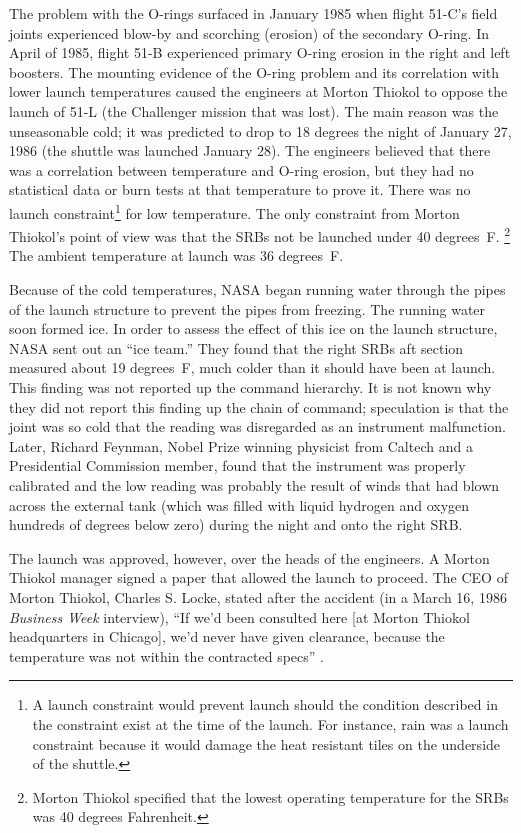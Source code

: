 The problem with the O-rings surfaced in January 1985 when flight 51-C's field joints experienced blow-by and scorching (erosion) of the secondary O-ring. In April of 1985, flight 51-B experienced primary O-ring erosion in the right and left boosters. The mounting evidence of the O-ring problem and its correlation with lower launch temperatures caused the engineers at Morton Thiokol to oppose the launch of 51-L (the Challenger mission that was lost). The main reason was the unseasonable cold; it was predicted to drop to 18 degrees the night of January 27, 1986 (the shuttle was launched January 28). The engineers believed that there was a correlation between temperature and O-ring erosion, but they had no statistical data or burn tests at that temperature to prove it. There was no launch constraint\footnote{A launch constraint would prevent launch should the condition described in the constraint exist at the time of the launch. For instance, rain was a launch constraint because it would damage the heat resistant tiles on the underside of the shuttle.} for low temperature. The only constraint from Morton Thiokol's point of view was that the SRBs not be launched under 40 degrees~F. \footnote{Morton Thiokol specified that the lowest operating temperature for the SRBs was 40 degrees Fahrenheit.} The ambient temperature at launch was 36 degrees~F.

Because of the cold temperatures, NASA began running water through the pipes of the launch structure to prevent the pipes from freezing. The running water soon formed ice. In order to assess the effect of this ice on the launch structure, NASA sent out an ``ice team.'' They found that the right SRBs aft section measured about 19 degrees~F, much colder than it should have been at launch. This finding was not reported up the command hierarchy. It is not known why they did not report this finding up the chain of command; speculation is that the joint was so cold that the reading was disregarded as an instrument malfunction. Later, Richard Feynman, Nobel Prize winning physicist from Caltech and a Presidential Commission member, found that the instrument was properly calibrated and the low reading was probably the result of winds that had blown across the external tank (which was filled with liquid hydrogen and oxygen hundreds of degrees below zero) during the night and onto the right SRB.

The launch was approved, however, over the heads of the engineers. A Morton Thiokol manager signed a paper that allowed the launch to proceed. The CEO of Morton Thiokol, Charles S. Locke, stated after the accident (in a March 16, 1986 {\em Business Week} interview), ``If we'd been consulted here [at Morton Thiokol headquarters in Chicago], we'd never have given clearance, because the temperature was not within the contracted specs'' \cite[p. 82]{bw}.

